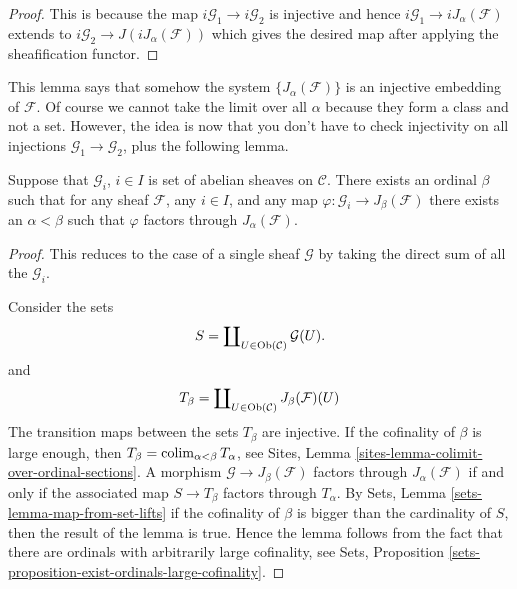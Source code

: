 \begin{proof}
This is because the map $i\mathcal{G}_1 \to i\mathcal{G}_2$ is injective
and hence $i\mathcal{G}_1 \to iJ_\alpha(\mathcal{F})$ extends to
$i\mathcal{G}_2 \to J(iJ_\alpha(\mathcal{F}))$ which gives the
desired map after applying the sheafification functor.
\end{proof}

\noindent
This lemma says that somehow the system $\{J_{\alpha}(\mathcal{F})\}$
is an injective embedding of $\mathcal{F}$. Of course
we cannot take the limit over all $\alpha$ because they form a class
and not a set. However, the idea is now that you don't have to check
injectivity on all injections $\mathcal{G}_1 \to \mathcal{G}_2$, plus
the following lemma.

\begin{lemma}
\label{lemma-map-into-smaller}
Suppose that $\mathcal{G}_i$, $i\in I$ is set of abelian sheaves
on $\mathcal{C}$. There exists an ordinal $\beta$ such that
for any sheaf $\mathcal{F}$, any $i\in I$, and any map
$\varphi : \mathcal{G}_i \to J_\beta(\mathcal{F})$ there exists an
$\alpha < \beta$ such that $ \varphi $ factors through
$J_\alpha(\mathcal{F})$.
\end{lemma}

\begin{proof}
This reduces to the case of a single sheaf $\mathcal{G}$
by taking the direct sum of all the $\mathcal{G}_i$.

\medskip\noindent
Consider the sets
$$
S = \coprod\nolimits_{U \in \mathop{\mathrm{Ob}}\nolimits(\mathcal{C})} \mathcal{G}(U).
$$
and
$$
T_\beta
=
\coprod\nolimits_{U \in \mathop{\mathrm{Ob}}\nolimits(\mathcal{C})} J_\beta(\mathcal{F})(U)
$$
The transition maps between the sets $T_\beta$ are injective.
If the cofinality of $\beta$ is large enough, then
$T_\beta = \mathop{\mathrm{colim}}\nolimits_{\alpha < \beta} T_\alpha$, see
Sites, Lemma \ref{sites-lemma-colimit-over-ordinal-sections}.
A morphism $\mathcal{G} \to J_\beta(\mathcal{F})$ factors
through $J_\alpha(\mathcal{F})$ if and only if
the associated map $S \to T_\beta$ factors through $T_\alpha$.
By
Sets, Lemma \ref{sets-lemma-map-from-set-lifts}
if the cofinality of $\beta$ is bigger than the cardinality
of $S$, then the result of the lemma is true. Hence the lemma
follows from the fact that there are ordinals with arbitrarily
large cofinality, see
Sets, Proposition \ref{sets-proposition-exist-ordinals-large-cofinality}.
\end{proof}

